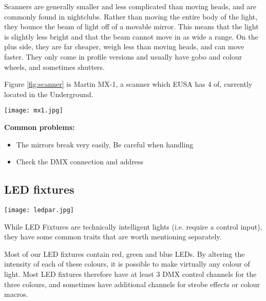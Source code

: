 \documentclass[14pt]{article} %
\let\Oldsubsection\subsection
\renewcommand{\subsection}{\FloatBarrier\Oldsubsection}
\begin{document}
Scanners are generally smaller and less complicated than moving heads, and are commonly found in nightclubs. Rather than moving the entire body of the light, they bounce the beam of light off of a movable mirror. This means that the light is slightly less bright and that the beam cannot move in as wide a range. On the plus side, they are far cheaper, weigh less than moving heads, and can move faster. They only come in profile versions and usually have gobo and colour wheels, and sometimes shutters. 

Figure \ref{fig:scanner} is Martin MX-1, a scanner which EUSA has 4 of, currently located in the Underground.

\begin{figure*}[h]
\begin{center}

\texttt{[image: mx1.jpg]}
\caption{Martin MX-1 Scanner}
\label{fig:scanner}

\end{center}
\end{figure*}

\textbf{Common problems:}
\begin{itemize}
\item 	The mirrors break very easily. Be careful when handling
\item	Check the DMX connection and address
\end{itemize}

\subsection{LED fixtures}

\begin{figure*}[h]
\begin{center}

\texttt{[image: ledpar.jpg]}
\caption{LED PAR 56}
\label{fig:ledpar}

\end{center}
\end{figure*}

While LED Fixtures are technically intelligent lights (i.e. require a control input), they have some common traits that are worth mentioning separately.

Most of our LED fixtures contain red, green and blue LEDs. By altering the intensity of each of these colours, it is possible to make virtually any colour of light. Most LED fixtures therefore have at least 3 DMX control channels for the three colours, and sometimes have additional channels for strobe effects or colour macros. 
\end{document}
